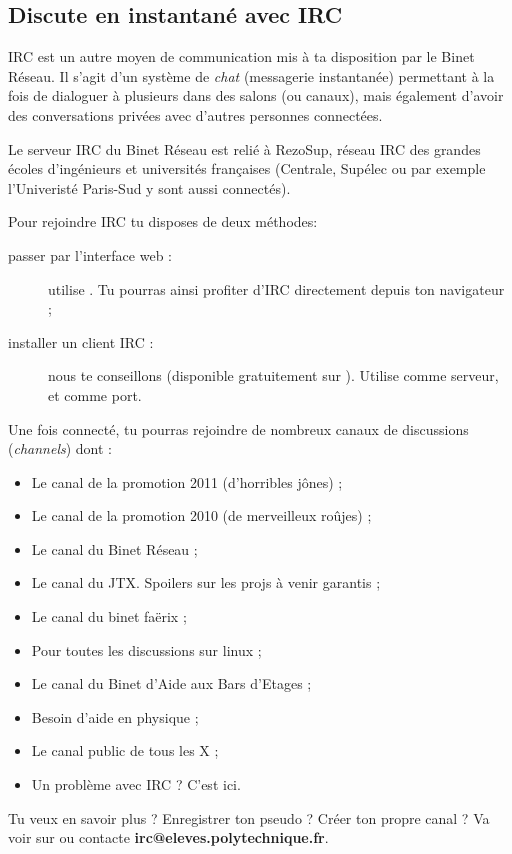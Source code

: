 
\subsection{Discute en instantané avec IRC}

\label{irc}

IRC est un autre moyen de communication mis à ta disposition par le Binet Réseau.
Il s'agit d'un système de \emph{chat} (messagerie instantanée) permettant à la fois de dialoguer à plusieurs dans des salons (ou canaux),
mais également d'avoir des conversations privées avec d'autres personnes connectées.


Le serveur IRC du Binet Réseau est relié à RezoSup, réseau IRC des grandes écoles d'ingénieurs et universités françaises (Centrale, Supélec ou par exemple l'Univeristé Paris-Sud y sont aussi connectés).

Pour rejoindre IRC tu disposes de deux méthodes:

                  
\begin{description}
  \item[passer par l'interface web :] utilise . Tu pourras ainsi profiter d'IRC directement depuis ton navigateur ;
  \item[installer un client IRC :] nous te conseillons  (disponible gratuitement sur \linebreak {}). Utilise   comme serveur, et  comme port.
\end{description}

 
Une fois connecté, tu pourras rejoindre de nombreux canaux de discussions (\emph{channels}) dont :
\begin{itemize}
  \item {} Le canal de la promotion 2011 (d'horribles jônes) ;
  \item {} Le canal de la promotion 2010 (de merveilleux roûjes) ;
  \item {} Le canal du Binet Réseau ;
  \item {} Le canal du JTX. Spoilers sur les projs à venir garantis ;
  \item {} Le canal du binet fa\"erix ;
  \item {} Pour toutes les discussions sur linux ;
  \item {} Le canal du Binet d'Aide aux Bars d'Etages ;
  \item {} Besoin d'aide en physique ;
  \item {} Le canal public de tous les X ;
  \item {} Un problème avec IRC ? C'est ici.
\end{itemize}

 Tu veux en savoir plus ? Enregistrer ton pseudo ? Créer ton propre canal ? Va voir sur  ou contacte \textbf{irc@eleves.polytechnique.fr}.


